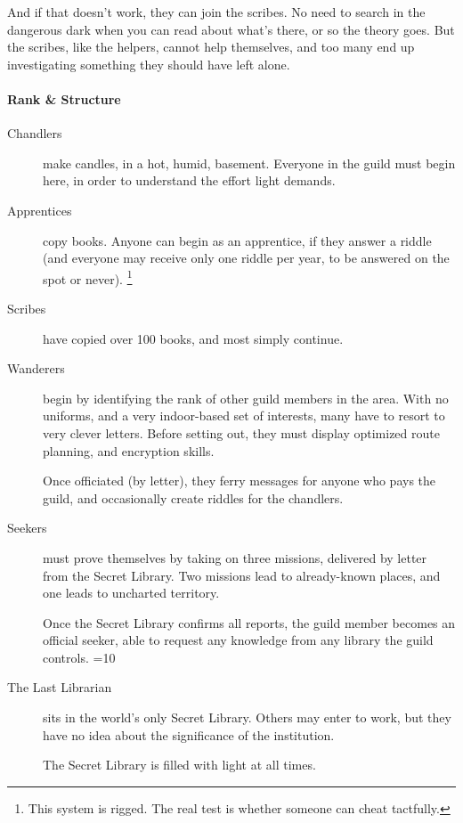 \begin{multicols}{2}
And if that doesn't work, they can join the scribes.
No need to search in the dangerous dark when you can read about what's there, or so the theory goes.
But the scribes, like the helpers, cannot help themselves, and too many end up investigating something they should have left alone.

\paragraph{Rank \& Structure}

\begin{description}
  \item[Chandlers]
  make candles, in a hot, humid, basement.
  Everyone in the guild must begin here, in order to understand the effort light demands.
  \item[Apprentices]
  copy books.
  Anyone can begin as an apprentice, if they answer a riddle (and everyone may receive only one riddle per year, to be answered on the spot or never).%
  \footnote{This system is rigged. The real test is whether someone can cheat tactfully.}
  \item[Scribes]
  have copied over 100 books, and most simply continue.
  \item[Wanderers]
  begin by identifying the rank of other guild members in the area.
  With no uniforms, and a very indoor-based set of interests, many have to resort to very clever letters.
  Before setting out, they must display optimized route planning, and encryption skills.

  Once officiated (by letter), they ferry messages for anyone who pays the guild, and occasionally create riddles for the chandlers.
  \item[Seekers]
  must prove themselves by taking on three missions, delivered by letter from the Secret Library.
  Two missions lead to already-known places, and one leads to uncharted territory.

  Once the Secret Library confirms all reports, the guild member becomes an official seeker, able to request any knowledge from any library the guild controls.
  \ifnum\value{season}=10
  \item[The Last Librarian]
  sits in the world's only Secret Library.
  Others may enter to work, but they have no idea about the significance of the institution.

  The Secret Library is filled with light at all times.
  \fi
\end{description}

\end{multicols}
